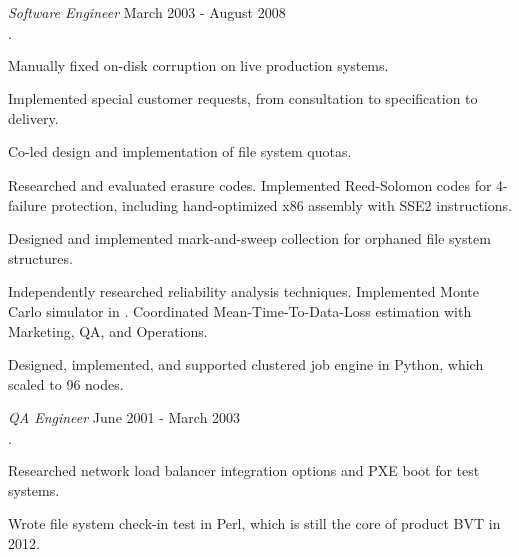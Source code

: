 \documentclass[11pt]{article}
\newenvironment{achievements}{\begin{list}{\bf \Large $\cdot$}{\topsep 2pt \itemsep 0pt}}{\vspace*{4pt}\end{list}}
\begin{document}
  {\em Software Engineer} \hfill March 2003 - August 2008
  \begin{achievements}
  \item Manually fixed on-disk corruption on live production systems.
  \item Implemented special customer requests, from consultation to
    specification to delivery.
  \item Co-led design and implementation of file system quotas.
  \item Researched and evaluated erasure codes.  Implemented Reed-Solomon
    codes for 4-failure protection, including hand-optimized x86 assembly with
    SSE2 instructions.
  \item Designed and implemented mark-and-sweep collection for orphaned file
    system structures.
  \item Independently researched reliability analysis techniques.  Implemented
    Monte Carlo simulator in \cpluspluslogo{}.  Coordinated Mean-Time-To-Data-Loss
    estimation with Marketing, QA, and Operations.
  \item Designed, implemented, and supported clustered job engine in Python,
    which scaled to 96 nodes.
  \end{achievements}

  {\em QA Engineer} \hfill June 2001 - March 2003
  \begin{achievements}
  \item Researched network load balancer integration options and PXE boot for
    test systems.
  \item Wrote file system check-in test in Perl, which is still the core of
    product BVT in 2012.
  \end{achievements}
\end{document}
